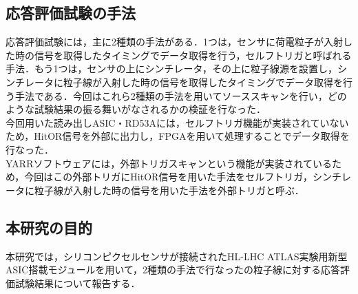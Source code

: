\subsection{応答評価試験の手法}
応答評価試験には，主に2種類の手法がある．1つは，センサに荷電粒子が入射した時の信号を取得したタイミングでデータ取得を行う，セルフトリガと呼ばれる手法．もう1つは，センサの上にシンチレータ，その上に粒子線源を設置し，シンチレータに粒子線が入射した時の信号を取得したタイミングでデータ取得を行う手法である．今回はこれら2種類の手法を用いてソーススキャンを行い，どのような試験結果の振る舞いがなされるかの検証を行なった．\\
今回用いた読み出しASIC・RD53Aには，セルフトリガ機能が実装されていないため，HitOR信号を外部に出力し，FPGAを用いて処理することでデータ取得を行なった．\\
YARRソフトウェアには，外部トリガスキャンという機能が実装されているため，今回はこの外部トリガにHitOR信号を用いた手法をセルフトリガ，シンチレータに粒子線が入射した時の信号を用いた手法を外部トリガと呼ぶ．

\subsection{本研究の目的}
本研究では，シリコンピクセルセンサが接続されたHL-LHC ATLAS実験用新型ASIC搭載モジュールを用いて，2種類の手法で行なったの粒子線に対する応答評価試験結果について報告する．
